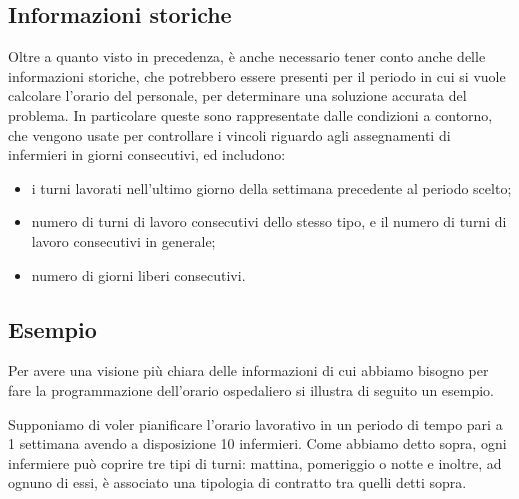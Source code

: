 \subsection{Informazioni storiche}
Oltre a quanto visto in precedenza, è anche necessario tener conto anche delle informazioni storiche, che potrebbero essere presenti per il periodo in cui si vuole calcolare l'orario del personale, per determinare una soluzione accurata del problema.
In particolare queste sono rappresentate dalle condizioni a contorno, che vengono usate per controllare i vincoli riguardo agli assegnamenti di infermieri in giorni consecutivi, ed includono:
\begin{itemize}
\item i turni lavorati nell'ultimo giorno della settimana precedente al periodo scelto;
\item numero di turni di lavoro consecutivi dello stesso tipo, e il numero di turni di lavoro consecutivi in generale;
\item numero di giorni liberi consecutivi.
\end{itemize}

\subsection{Esempio}
Per avere una visione più chiara delle informazioni di cui abbiamo bisogno per fare la programmazione dell'orario ospedaliero si illustra di seguito un esempio.

Supponiamo di voler pianificare l'orario lavorativo in un periodo di tempo pari a 1 settimana avendo a disposizione 10 infermieri.
Come abbiamo detto sopra, ogni infermiere può coprire tre tipi di turni: mattina, pomeriggio o notte e inoltre, ad ognuno di essi, è associato una tipologia di contratto tra quelli detti sopra. 

%

